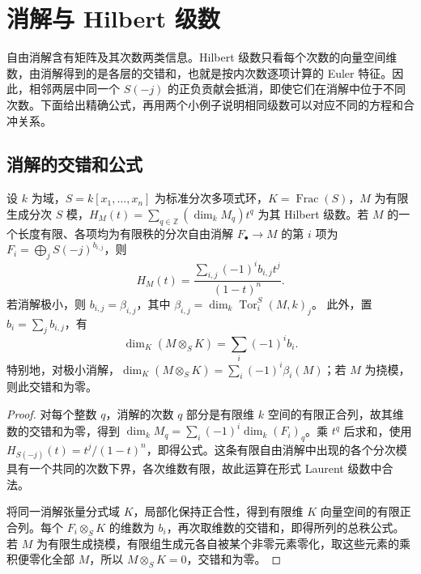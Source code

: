 
\section{消解与 Hilbert 级数}
\label{b3:sec:2103}


%
%
%

自由消解含有矩阵及其次数两类信息。Hilbert 级数只看每个次数的向量空间维数，由消解得到的是各层的交错和，也就是按内次数逐项计算的 Euler 特征。因此，相邻两层中同一个 \(S(-j)\) 的正负贡献会抵消，即使它们在消解中位于不同次数。下面给出精确公式，再用两个小例子说明相同级数可以对应不同的方程和合冲关系。

\subsection{消解的交错和公式}
\label{b3:subsec:2103:01}

\begin{proposition}\label{b3:prop:resolution-hilbert-series}\label{b3:prop:betti-rank-euler}
	设 \(k\) 为域，\(S=k[x_1,\ldots,x_n]\) 为标准分次多项式环，\(K=\operatorname{Frac}(S)\)，\(M\) 为有限生成分次 \(S\) 模，\(H_M(t)=\sum_{q\in\mathbb Z}(\dim_kM_q)t^q\) 为其 Hilbert 级数。若 \(M\) 的一个长度有限、各项均为有限秩的分次自由消解 \(F_\bullet\to M\) 的第 \(i\) 项为 \(F_i=\bigoplus_jS(-j)^{b_{i,j}}\)，则
	\begin{equation}\label{b3:eq:betti-hilbert-numerator}
		H_M(t)=\frac{\sum_{i,j}(-1)^ib_{i,j}t^j}{(1-t)^n}.
	\end{equation}
	若消解极小，则 \(b_{i,j}=\beta_{i,j}\)，其中 \(\beta_{i,j}=\dim_k\operatorname{Tor}_i^S(M,k)_j\)。 此外，置 \(b_i=\sum_j b_{i,j}\)，有
	\[
		\dim_K(M\otimes_SK)=\sum_i(-1)^ib_i.
	\]
	特别地，对极小消解，\(\dim_K(M\otimes_SK)=\sum_i(-1)^i\beta_i(M)\)；若 \(M\) 为挠模，则此交错和为零。
\end{proposition}
\begin{proof}
	对每个整数 \(q\)，消解的次数 \(q\) 部分是有限维 \(k\) 空间的有限正合列，故其维数的交错和为零，得到 \(\dim_kM_q=\sum_i(-1)^i\dim_k(F_i)_q\)。乘 \(t^q\) 后求和，使用 \(H_{S(-j)}(t)=t^j/(1-t)^n\)，即得公式。这条有限自由消解中出现的各个分次模具有一个共同的次数下界，各次维数有限，故此运算在形式 Laurent 级数中合法。

	将同一消解张量分式域 \(K\)，局部化保持正合性，得到有限维 \(K\) 向量空间的有限正合列。每个 \(F_i\otimes_SK\) 的维数为 \(b_i\)，再次取维数的交错和，即得所列的总秩公式。若 \(M\) 为有限生成挠模，有限组生成元各自被某个非零元素零化，取这些元素的乘积便零化全部 \(M\)，所以 \(M\otimes_SK=0\)，交错和为零。
\end{proof}

